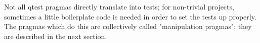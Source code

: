 
Not all qtest pragmas directly translate into tests; for non-trivial projects, sometimes a
little boilerplate code is needed in order to set the tests up properly. The pragmas which
do this are collectively called "manipulation pragmas"; they are described in the next
section.